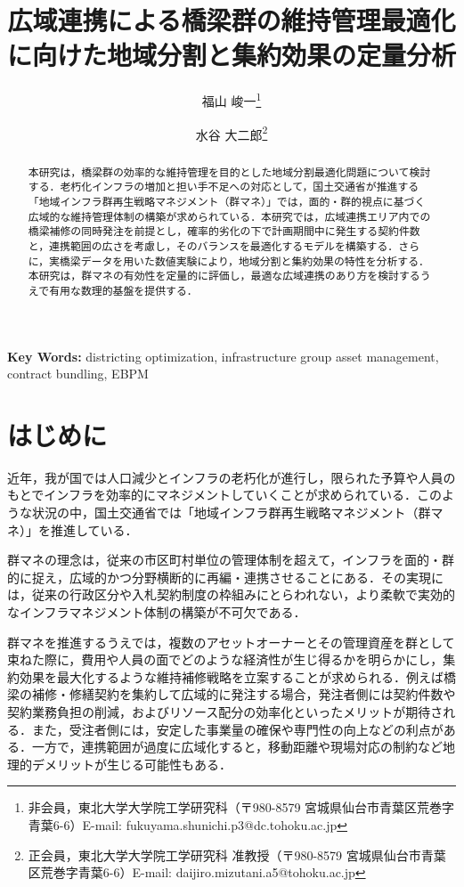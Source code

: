 \documentclass[Journal,letterpaper,InsideFigs,NoLineNumbers]{ascelike-new}
\title{広域連携による橋梁群の維持管理最適化に向けた地域分割と集約効果の定量分析}
\author{
福山 峻一\thanks{非会員，東北大学大学院工学研究科（〒980-8579 宮城県仙台市青葉区荒巻字青葉6-6）E-mail: fukuyama.shunichi.p3@dc.tohoku.ac.jp}
\and
水谷 大二郎\thanks{正会員，東北大学大学院工学研究科 准教授（〒980-8579 宮城県仙台市青葉区荒巻字青葉6-6）E-mail: daijiro.mizutani.a5@tohoku.ac.jp}
}
\begin{document}
\maketitle

\begin{abstract}
本研究は，橋梁群の効率的な維持管理を目的とした地域分割最適化問題について検討する．老朽化インフラの増加と担い手不足への対応として，国土交通省が推進する「地域インフラ群再生戦略マネジメント（群マネ）」では，面的・群的視点に基づく広域的な維持管理体制の構築が求められている．本研究では，広域連携エリア内での橋梁補修の同時発注を前提とし，確率的劣化の下で計画期間中に発生する契約件数と，連携範囲の広さを考慮し，そのバランスを最適化するモデルを構築する．さらに，実橋梁データを用いた数値実験により，地域分割と集約効果の特性を分析する．本研究は，群マネの有効性を定量的に評価し，最適な広域連携のあり方を検討するうえで有用な数理的基盤を提供する．
\end{abstract}

\begin{center}
\textbf{Key Words:} districting optimization, infrastructure group asset management, contract bundling, EBPM
\end{center}

\section{はじめに}

近年，我が国では人口減少とインフラの老朽化が進行し，限られた予算や人員のもとでインフラを効率的にマネジメントしていくことが求められている．このような状況の中，国土交通省では「地域インフラ群再生戦略マネジメント（群マネ）」を推進している．

群マネの理念は，従来の市区町村単位の管理体制を超えて，インフラを面的・群的に捉え，広域的かつ分野横断的に再編・連携させることにある．その実現には，従来の行政区分や入札契約制度の枠組みにとらわれない，より柔軟で実効的なインフラマネジメント体制の構築が不可欠である．

群マネを推進するうえでは，複数のアセットオーナーとその管理資産を群として束ねた際に，費用や人員の面でどのような経済性が生じ得るかを明らかにし，集約効果を最大化するような維持補修戦略を立案することが求められる．例えば橋梁の補修・修繕契約を集約して広域的に発注する場合，発注者側には契約件数や契約業務負担の削減，およびリソース配分の効率化といったメリットが期待される．また，受注者側には，安定した事業量の確保や専門性の向上などの利点がある．一方で，連携範囲が過度に広域化すると，移動距離や現場対応の制約など地理的デメリットが生じる可能性もある．
\end{document}
